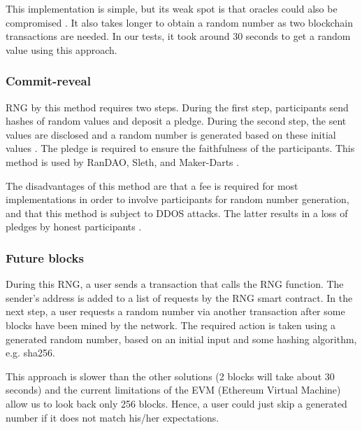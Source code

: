 \documentclass[12pt]{article}
\begin{document}
This implementation is simple, but its weak spot is that oracles could also be compromised  \cite{Dao_Casino_Ksenya_Serova_2017_Jun_27}. It also takes longer to obtain a random number as two blockchain transactions are needed. In our tests, it took around 30 seconds to get a random value using this approach.\par


\vspace{\baselineskip}
 \subsubsection{Commit-reveal}\label{Commit-reveal}  \par

RNG by this method requires two steps. During the first step, participants send hashes of random values and deposit a pledge. During the second step, the sent values are disclosed and a random number is generated based on these initial values  \cite{Dao_Casino_Ksenya_Serova_2017_Jun_27}. The pledge is required to ensure the faithfulness of the participants. This method is used by RanDAO, Sleth, and Maker-Darts  \cite{Dao_Casino_Ksenya_Serova_2017_Jun_27}.\par

The disadvantages of this method are that a fee is required for most implementations in order to involve participants for random number generation, and that this method is subject to DDOS attacks. The latter results in a loss of pledges by honest participants  \cite{Dao_Casino_Ksenya_Serova_2017_Jun_27}.\par



\vspace{\baselineskip}
 \subsubsection{Future blocks}\label{Future blocks} \par

During this RNG, a user sends a transaction that calls the RNG function. The sender's address is added to a list of requests by the RNG smart contract. In the next step, a user requests a random number via another transaction after some blocks have been mined by the network. The required action is taken using a generated random number, based on an initial input and some hashing algorithm, e.g. sha256.\par

This approach is slower than the other solutions (2 blocks will take about 30 seconds) and the current limitations of the EVM (Ethereum Virtual Machine) allow us to look back only 256 blocks. Hence, a user could just skip a generated number if it does not match his/her expectations.\par
\end{document}
